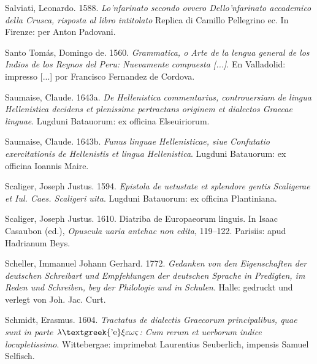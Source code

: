 \begin{styleStandard}
Salviati, Leonardo. 1588. \textit{Lo’nfarinato secondo ovvero Dello’nfarinato accademico della Crusca, risposta al libro intitolato }Replica di Camillo Pellegrino ec. In Firenze: per Anton Padovani.
\end{styleStandard}

\begin{styleStandard}
Santo Tomás, Domingo de. 1560. \textit{Grammatica, o Arte de la lengua general de los Indios de los Reynos del Peru: Nuevamente compuesta [...]}. En Valladolid: impresso [...] por Francisco Fernandez de Cordova.
\end{styleStandard}

\begin{styleStandard}
Saumaise, Claude. 1643a. \textit{De Hellenistica commentarius, controuersiam de lingua Hellenistica decidens et plenissime pertractans originem et dialectos Graecae linguae}. Lugduni Batauorum: ex officina Elseuiriorum.
\end{styleStandard}

\begin{styleStandard}
Saumaise, Claude. 1643b. \textit{Funus linguae Hellenisticae, siue Confutatio exercitationis de Hellenistis et lingua Hellenistica}. Lugduni Batauorum: ex officina Ioannis Maire.
\end{styleStandard}

\begin{styleStandard}
Scaliger, Joseph Justus. 1594. \textit{Epistola de uetustate et splendore gentis Scaligerae et Iul. Caes. Scaligeri uita}. Lugduni Batauorum: ex officina Plantiniana.
\end{styleStandard}

\begin{styleStandard}
Scaliger, Joseph Justus. 1610. Diatriba de Europaeorum linguis. In Isaac Casaubon (ed.), \textit{Opuscula uaria antehac non edita}, 119–122. Parisiis: apud Hadrianum Beys.
\end{styleStandard}

\begin{styleStandard}
Scheller, Immanuel Johann Gerhard. 1772. \textit{Gedanken von den Eigenschaften der deutschen Schreibart und Empfehlungen der deutschen Sprache in Predigten, im Reden und Schreiben, bey der Philologie und in Schulen}. Halle: gedruckt und verlegt von Joh. Jac. Curt.
\end{styleStandard}

\begin{styleStandard}
Schmidt, Erasmus. 1604. \textit{Tractatus de dialectis Graecorum principalibus, quae sunt in parte $\lambda \text{\textgreek{'e}}\xi \varepsilon \omega \varsigma $: Cum rerum et uerborum indice locupletissimo}. Wittebergae: imprimebat Laurentius Seuberlich, impensis Samuel Selfisch.
\end{styleStandard}

